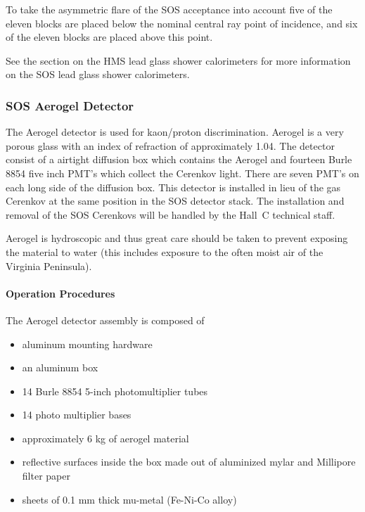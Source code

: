 To take the asymmetric flare of the SOS acceptance into account five of the
eleven blocks are placed below the nominal central ray point of incidence,
and six of the eleven blocks are placed above this point.

See the section on the HMS lead glass shower calorimeters for
 more information on the SOS lead glass
shower calorimeters.


\subsubsection{SOS Aerogel Detector }

The Aerogel detector is used for kaon/proton discrimination.
Aerogel is a very porous glass with an index of refraction of approximately
1.04.
The detector consist of a airtight diffusion box which contains the
Aerogel and fourteen Burle 8854 five inch PMT's which collect
the Cerenkov light. There are seven PMT's on each long side of the diffusion
box.
This detector is installed in lieu of the gas Cerenkov
at the same position in the SOS detector stack. The installation and
removal of the SOS Cerenkovs will be handled by the Hall~C technical staff.

Aerogel is hydroscopic and thus great care should be taken to prevent
exposing the material to water (this includes exposure to the often moist
air of the Virginia Peninsula).


\paragraph{Operation Procedures}

The Aerogel detector assembly is composed of

\begin{itemize}
\item{aluminum mounting hardware}
\item{an aluminum box}
\item{14 Burle 8854 5-inch photomultiplier tubes}
\item{14 photo multiplier bases}
\item{approximately 6 kg of aerogel material}
\item{reflective surfaces inside the box made out of
aluminized mylar and Millipore filter paper}
\item{sheets of 0.1 mm thick mu-metal (Fe-Ni-Co alloy)}
\end{itemize}

